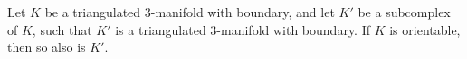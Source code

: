 Let $K$ be a triangulated 3-manifold with boundary, and let $K'$ be a subcomplex of $K$, such that $K'$ is a triangulated 3-manifold with boundary. If $K$ is orientable, then so also is $K'$.
